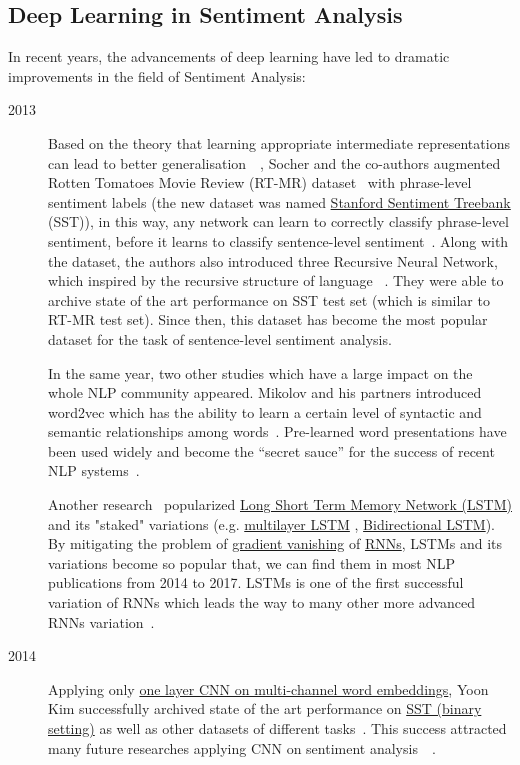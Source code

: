 \subsection{Deep Learning in Sentiment Analysis}
In recent years, the advancements of deep learning have led to dramatic improvements in the field of Sentiment Analysis:
\begin{description}
\item [2013] Based on the theory that learning appropriate intermediate representations can lead to better generalisation~\cite{knowledge-matter}~\cite{tran-auto-encoder}, Socher and the co-authors augmented Rotten Tomatoes Movie Review  (RT-MR) dataset~\cite{Rotten-Tomato} with phrase-level sentiment labels (the new dataset was named \hyperref[sec:sst]{Stanford Sentiment Treebank} (SST)), in this way, any network can learn to correctly classify phrase-level sentiment, before it learns to classify sentence-level sentiment~\cite{socher2013recursive}. Along with the dataset, the authors also introduced three Recursive Neural Network, which inspired by the recursive structure of language ~\cite{socher2013recursive}.
They were able to archive state of the art performance on SST test set (which is similar to RT-MR test set). 
Since then, this dataset has become the most popular dataset for the task of sentence-level sentiment analysis.

In the same year, two other studies which have a large impact on the whole NLP community appeared. 
Mikolov and his partners introduced word2vec which has the ability to learn a certain level of syntactic and semantic relationships among words~\cite{word2vec}. 
Pre-learned word presentations have been used widely and become the “secret sauce” for the success of recent NLP systems~\cite{Luong_betterword}.

Another research~\cite{GravesLSTM} popularized \hyperref[sec:lstm]{Long Short Term Memory Network (LSTM)} and its "staked" variations (e.g. \hyperref[sec:multilayer-lstm]{multilayer LSTM} , \hyperref[sec:bilstm]{Bidirectional LSTM}).
By mitigating the problem of \hyperref[sec:gradient-vanish]{gradient vanishing} of \hyperref[sec:RNN]{RNNs}, LSTMs and its variations become so popular that, we can find them in most NLP publications from 2014 to 2017. 
LSTMs is one of the first successful variation of RNNs which leads the way to many other more advanced RNNs variation~\cite{olah2016attention}.

\item [2014] Applying only \hyperref[kim-cnn]{one layer CNN on multi-channel word embeddings}, Yoon Kim successfully archived state of the art performance on \hyperref[sec:sst]{SST (binary setting)} as well as other datasets of different tasks~\cite{KimCNN}. 
This success attracted many future researches applying CNN on sentiment analysis~\cite{2-layer-cnn}~\cite{cnn-rnn}.


\end{description}
